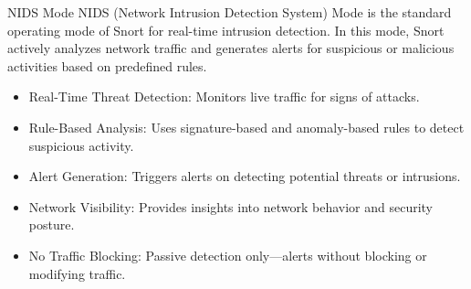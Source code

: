 \begin{frame}[t]{NIDS Mode}
  \fontsize{12}{14.5}\selectfont
  \vspace{0.1cm}
  NIDS (Network Intrusion Detection System) Mode is the standard operating mode of Snort for real-time intrusion detection. In this mode, Snort actively analyzes network traffic and generates alerts for suspicious or malicious activities based on predefined rules.
  \vspace{0.12cm}
  \begin{itemize}
    \item \textcolor{WarningColor}{Real-Time Threat Detection:} Monitors live traffic for signs of attacks.
    \item \textcolor{WarningColor}{Rule-Based Analysis:} Uses signature-based and anomaly-based rules to detect suspicious activity.
    \item \textcolor{WarningColor}{Alert Generation:} Triggers alerts on detecting potential threats or intrusions.
    \item \textcolor{WarningColor}{Network Visibility:} Provides insights into network behavior and security posture.
    \item \textcolor{WarningColor}{No Traffic Blocking:} Passive detection only---alerts without blocking or modifying traffic.
  \end{itemize}
\end{frame}
